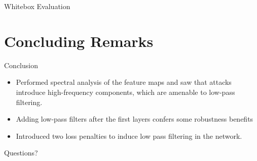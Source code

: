 \documentclass{beamer}
\begin{document}
\begin{frame}{Whitebox Evaluation}
	\begin{table}[t!]
	  \begin{center}
	    \caption{Results from white box evaluation}
	    \label{tab:table2}
	  \end{center}
	\end{table}
\end{frame}
\section{Concluding Remarks}
\begin{frame}{Conclusion}
\begin{itemize}
	\item Performed spectral analysis of the feature maps and saw that attacks introduce high-frequency components, which are amenable to low-pass filtering.
	\pause
	\item Adding low-pass filters after the first layers confers some robustness benefits
	\pause
	\item Introduced two loss penalties to induce low pass filtering in the network.
\end{itemize}
\end{frame}

\begin{frame}[standout]
Questions?
\end{frame}
\end{document}
